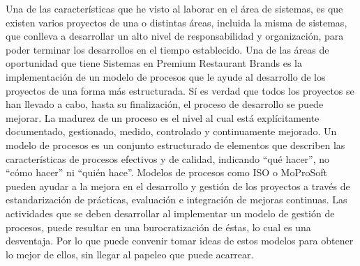 Una de las características que he visto al laborar en el área de sistemas, es que existen varios proyectos de una o distintas áreas, incluida la misma de sistemas, que conlleva a desarrollar un alto nivel de responsabilidad y organización, para poder terminar los desarrollos en el tiempo establecido. Una de las áreas de oportunidad que tiene Sistemas en Premium Restaurant Brands es la implementación de un modelo de procesos que le ayude al desarrollo de los proyectos de una forma más estructurada. Sí es verdad que todos los proyectos se han llevado a cabo, hasta su finalización, el proceso de desarrollo se puede mejorar. La madurez de un proceso es el nivel al cual está explícitamente documentado, gestionado, medido, controlado y continuamente mejorado. Un modelo de procesos es un conjunto estructurado de elementos que describen las características de procesos efectivos y de calidad, indicando ``qué hacer'', no ``cómo hacer'' ni ``quién hace''. Modelos de procesos como ISO o MoProSoft pueden ayudar a la mejora en el desarrollo y gestión de los proyectos a través de estandarización de prácticas, evaluación e integración de mejoras continuas. Las actividades que se deben desarrollar al implementar un modelo de gestión de procesos, puede resultar en una  burocratización de éstas, lo cual es una desventaja. Por lo que puede convenir tomar ideas de estos modelos para obtener lo mejor de ellos, sin llegar al papeleo que puede acarrear.

